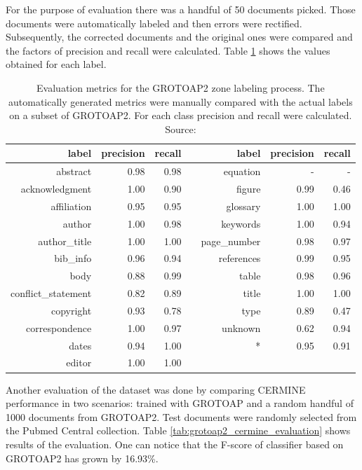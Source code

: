 \quad
For the purpose of evaluation there was a handful of 50 documents picked. Those documents were automatically labeled and then errors were rectified. Subsequently, the corrected documents and the original ones were compared and the factors of precision and recall were calculated. Table \ref{tab:grotoap2_evaluation} shows the values obtained for each label.

\begin{table}
\centering
\begin{tabular}{@{}rrrcrrr@{}}
 \toprule
label & precision & recall & \phantom{abc} & label & precision & recall\\ \midrule
abstract & 0.98 & 0.98 && equation & - & - \\ 
acknowledgment & 1.00 & 0.90 && figure & 0.99 & 0.46 \\ 
affiliation & 0.95 & 0.95 && glossary & 1.00 & 1.00 \\ 
author & 1.00 & 0.98 && keywords & 1.00 & 0.94 \\ 
author\_title & 1.00 & 1.00 && page\_number & 0.98 & 0.97 \\ 
bib\_info & 0.96 & 0.94 && references & 0.99 & 0.95 \\ 
body & 0.88 & 0.99 && table & 0.98 & 0.96 \\ 
conflict\_statement & 0.82 & 0.89 && title & 1.00 & 1.00 \\ 
copyright & 0.93 & 0.78 && type & 0.89 & 0.47 \\ 
correspondence & 1.00 & 0.97 && unknown & 0.62 & 0.94 \\ 
dates & 0.94 & 1.00 && * & 0.95 & 0.91 \\ 
editor & 1.00 & 1.00 &&   &      &       \\
\bottomrule
\end{tabular}
\caption{Evaluation metrics for the GROTOAP2 zone labeling process. The automatically generated metrics were manually compared with the actual labels on a subset of GROTOAP2. For each class precision and recall were calculated. Source: \cite{DominikaTkaczykPaweSzostek2014}}
\label{tab:grotoap2_evaluation}
\end{table}

Another evaluation of the dataset was done by comparing CERMINE performance in two scenarios: trained with GROTOAP and a random handful of 1000 documents from GROTOAP2. Test documents were randomly selected from the Pubmed Central collection. Table \ref{tab:grotoap2_cermine_evaluation} shows results of the evaluation. One can notice that the F-score of classifier based on GROTOAP2 has grown by 16.93\%.

